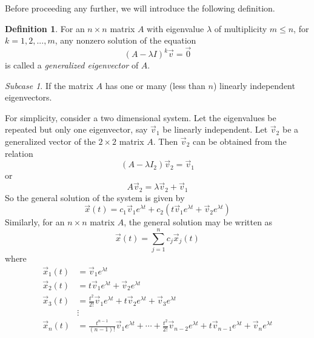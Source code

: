 \documentclass[11pt]{book}
\theoremstyle{definition}\newtheorem{definition}[subsection]{Definition}
\theoremstyle{definition}\newtheorem{example}[subsection]{Example}
\theoremstyle{definition}\newtheorem{notation}[subsection]{Notation}
\theoremstyle{definition}\newtheorem{remark}[subsection]{Remark}
\theoremstyle{theorem}\newtheorem{theorem}[subsection]{Theorem}
\theoremstyle{theorem}\newtheorem{lemma}[subsection]{Lemma}
\theoremstyle{theorem}\newtheorem{proposition}[subsection]{Proposition}
\theoremstyle{theorem}\newtheorem{corollary}[subsection]{Corollary}
\theoremstyle{theorem}\newtheorem{case}{Case}
\theoremstyle{remark}\newtheorem{subcase}{Subcase}[case]
\begin{document}
Before proceeding any further, we will introduce the following definition.

\begin{definition}\label{definition:1.2.1}
    For an $n \times n$ matrix $A$ with eigenvalue $\lambda$ of multiplicity $m \leq n$, for $k = 1, 2,..., m$, any nonzero solution of the equation
    \begin{equation*}
        (A - \lambda I)^k\vec{v} = \vec{0}
    \end{equation*}
    is called a \emph{generalized eigenvector} of $A$.
\end{definition}

\begin{subcase}
    If the matrix $A$ has one or many (less than $n$) linearly independent eigenvectors.
\end{subcase}

For simplicity, consider a two dimensional system. Let the eigenvalues be repeated but only one eigenvector, say $\vec{v}_1$ be linearly independent. Let $\vec{v}_2$ be a generalized vector of the $2 \times 2$ matrix $A$. Then $\vec{v}_2$ can be obtained from the relation
\begin{equation*}
    (A - \lambda I_2)\vec{v}_2 = \vec{v}_1
\end{equation*}
or
\begin{equation*}
    A\vec{v}_2 = \lambda \vec{v}_2 + \vec{v}_1
\end{equation*}
So the general solution of the system is given by
\begin{equation*}
    \vec{x}(t) = c_1\vec{v}_1e^{\lambda t} + c_2(t\vec{v}_1e^{\lambda t} + \vec{v}_2e^{\lambda t})
\end{equation*}
Similarly, for an $n \times n$ matrix $A$, the general solution may be written as
\begin{equation*}
    \vec{x}(t) = \sum_{j = 1}^{n} c_j\vec{x}_j(t)
\end{equation*}
where
\begin{align*}
    \vec{x}_1(t) &= \vec{v}_1e^{\lambda t} \\
    \vec{x}_2(t) &= t\vec{v}_1e^{\lambda t} + \vec{v}_2e^{\lambda t} \\
    \vec{x}_3(t) &= \frac{t^2}{2!}\vec{v}_1e^{\lambda t} + t\vec{v}_2e^{\lambda t} + \vec{v}_3e^{\lambda t} \\
    &\vdots \\
    \vec{x}_n(t) &= \frac{t^{n - 1}}{(n - 1)!}\vec{v}_1e^{\lambda t} + \cdots + \frac{t^2}{2!}\vec{v}_{n - 2}e^{\lambda t} + t\vec{v}_{n - 1}e^{\lambda t} + \vec{v}_ne^{\lambda t}
\end{align*}
\end{document}
